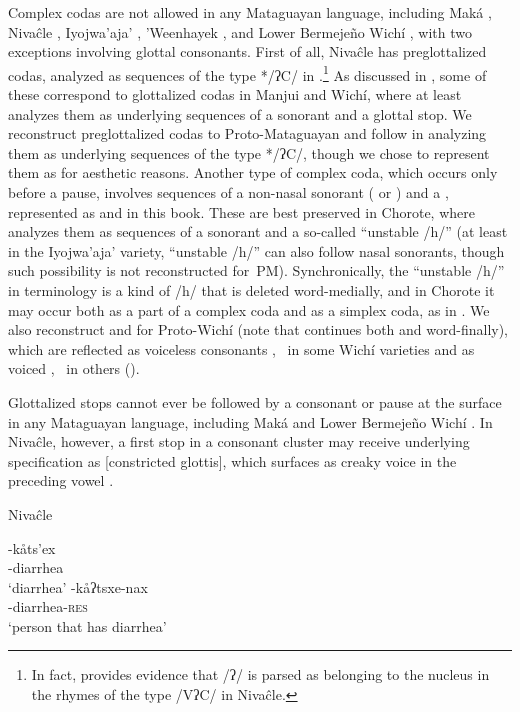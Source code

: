 Complex codas are not allowed in any Mataguayan language, including Maká \citep[58]{AG89}, Nivaĉle \citep[5]{AnG16}, Iyojwa’aja’ \citep[90]{JC14b}, ’Weenhayek \citep[3]{KC94}, and Lower Bermejeño Wichí \citep[98]{VN14}, with two exceptions involving glottal consonants. First of all, Nivaĉle has preglottalized codas, analyzed as sequences of the type */ʔC/ in \citet{AnG15,AnG16b}.\footnote{In fact, \citet{AnG15,AnG16b} provides evidence that /ʔ/ is parsed as belonging to the nucleus in the rhymes of the type /VʔC/ in Nivaĉle.} As discussed in , some of these correspond to glottalized codas in Manjui and Wichí, where at least \citet{KC94} analyzes them as underlying sequences of a sonorant and a glottal stop. We reconstruct preglottalized codas to Proto-Mataguayan and follow \citet{AnG15,AnG16b} in analyzing them as underlying sequences of the type */ʔC/, though we chose to represent them as  for aesthetic reasons. Another type of complex coda, which occurs only before a pause, involves sequences of a non-nasal sonorant ( or ) and a , represented as  and  in this book. These are best preserved in Chorote, where \citet[88]{JC14b} analyzes them as sequences of a sonorant and a so-called ``unstable /h/'' (at least in the Iyojwa'aja' variety, ``unstable /h/'' can also follow nasal sonorants, though such possibility is not reconstructed for~PM). Synchronically, the ``unstable /h/'' in  terminology is a kind of /h/ that is deleted word-medially, and in Chorote it may occur both as a part of a complex coda and as a simplex coda, as in . We also reconstruct  and  for Proto-Wichí (note that  continues both  and  word-finally), which are reflected as voiceless consonants ,~ in some Wichí varieties and as voiced ,~ in others ().

Glottalized stops cannot ever be followed by a consonant or pause at the surface in any Mataguayan language, including Maká \citep[58]{AG89} and Lower Bermejeño Wichí \citep[98]{VN14}. In Nivaĉle, however, a first stop in a consonant cluster may receive underlying specification as [constricted glottis], which surfaces as creaky voice in the preceding vowel .

\ea\label{ex:côts'ej:niv}
Nivaĉle \citep[6]{AnG16}\\
    \begin{xlist}
        \ex\gll -kåts’ex \\
                -diarrhea\\
                \glt `diarrhea'
        \ex\gll -kåʔtsxe-nax \\
                -diarrhea-\textsc{res}\\
                \glt `person that has diarrhea'
    \end{xlist}
\z

